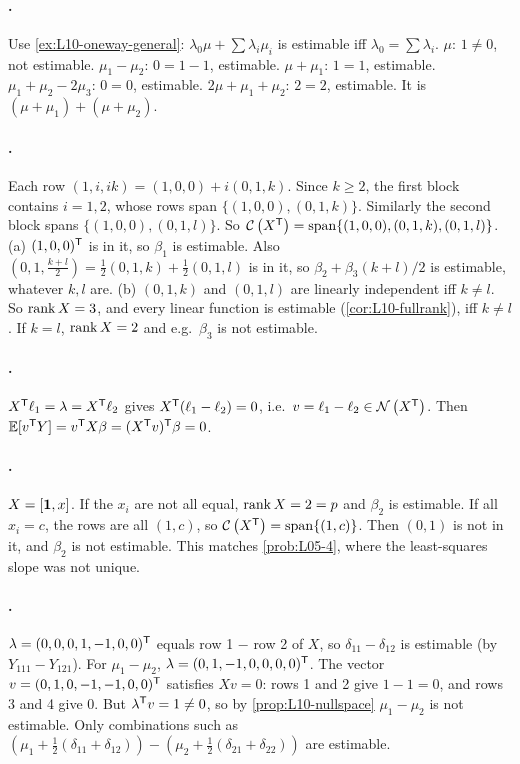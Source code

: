 \paragraph{.}
Use \cref{ex:L10-oneway-general}: $\lambda_0\mu+\sum\lambda_i\mu_i$ is estimable iff $\lambda_0=\sum\lambda_i$.
$\mu$: $1\ne0$, not estimable. $\mu_1-\mu_2$: $0=1-1$, estimable. $\mu+\mu_1$: $1=1$, estimable.
$\mu_1+\mu_2-2\mu_3$: $0=0$, estimable. $2\mu+\mu_1+\mu_2$: $2=2$, estimable. It is $(\mu+\mu_1)+(\mu+\mu_2)$.

\paragraph{.}
Each row $(1,i,ik)=(1,0,0)+i(0,1,k)$. Since $k\ge2$, the first block contains $i=1,2$, whose rows
span $\{(1,0,0),(0,1,k)\}$. Similarly the second block spans $\{(1,0,0),(0,1,l)\}$. So
$\mathcal{C}\left(X^{\mathsf T}\right)=\mathrm{span}\{(1,0,0),(0,1,k),(0,1,l)\}$.
(a) $(1,0,0)^{\mathsf T}$ is in it, so $\beta_1$ is estimable. Also $(0,1,\frac{k+l}2)=\frac12(0,1,k)+\frac12(0,1,l)$ is in it,
so $\beta_2+\beta_3(k+l)/2$ is estimable, whatever $k,l$ are.
(b) $(0,1,k)$ and $(0,1,l)$ are linearly independent iff $k\ne l$. So $\operatorname{rank} X=3$, and every linear
function is estimable (\cref{cor:L10-fullrank}), iff $k\ne l$. If $k=l$, $\operatorname{rank} X=2$ and e.g.\ $\beta_3$ is
not estimable.

\paragraph{.}
$X^{\mathsf T}\ell_1=\lambda=X^{\mathsf T}\ell_2$ gives $X^{\mathsf T}(\ell_1-\ell_2)=0$, i.e.\ $v=\ell_1-\ell_2\in\mathcal{N}\left(X^{\mathsf T}\right)$.
Then $\mathbb E[v^{\mathsf T} Y]=v^{\mathsf T} X\beta=(X^{\mathsf T} v)^{\mathsf T}\beta=0$.

\paragraph{.}
$X=[\mathbf 1,x]$. If the $x_i$ are not all equal, $\operatorname{rank} X=2=p$ and $\beta_2$ is estimable. If all
$x_i=c$, the rows are all $(1,c)$, so $\mathcal{C}\left(X^{\mathsf T}\right)=\mathrm{span}\{(1,c)\}$. Then $(0,1)$ is not in it, and $\beta_2$
is not estimable. This matches \cref{prob:L05-4}, where the least-squares slope was not unique.

\paragraph{.}
$\lambda=(0,0,0,1,-1,0,0)^{\mathsf T}$ equals row 1 $-$ row 2 of $X$, so $\delta_{11}-\delta_{12}$ is estimable (by
$Y_{111}-Y_{121}$). For $\mu_1-\mu_2$, $\lambda=(0,1,-1,0,0,0,0)^{\mathsf T}$. The vector
$v=(0,1,0,-1,-1,0,0)^{\mathsf T}$ satisfies $Xv=0$: rows 1 and 2 give $1-1=0$, and rows 3 and 4 give $0$. But
$\lambda^{\mathsf T} v=1\ne0$, so by \cref{prop:L10-nullspace} $\mu_1-\mu_2$ is not estimable. Only
combinations such as $(\mu_1+\frac12(\delta_{11}+\delta_{12}))-(\mu_2+\frac12(\delta_{21}+\delta_{22}))$ are estimable.
